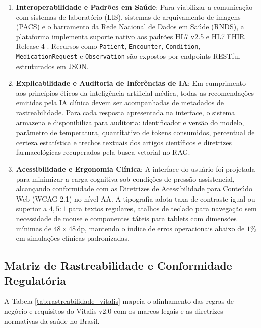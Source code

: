 \begin{enumerate}[label=\textbf{RNF-\arabic*:}, leftmargin=*]
    \item \textbf{Interoperabilidade e Padrões em Saúde}:
    Para viabilizar a comunicação com sistemas de laboratório (LIS), sistemas de arquivamento de imagens (PACS) e o barramento da Rede Nacional de Dados em Saúde (RNDS), a plataforma implementa suporte nativo aos padrões HL7 v2.5 e HL7 FHIR Release 4 \cite{hl7_fhir:2019}. Recursos como \texttt{Patient}, \texttt{Encounter}, \texttt{Condition}, \texttt{MedicationRequest} e \texttt{Observation} são expostos por endpoints RESTful estruturados em JSON.

    \item \textbf{Explicabilidade e Auditoria de Inferências de IA}:
    Em cumprimento aos princípios éticos da inteligência artificial médica, todas as recomendações emitidas pela IA clínica devem ser acompanhadas de metadados de rastreabilidade. Para cada resposta apresentada na interface, o sistema armazena e disponibiliza para auditoria: identificador e versão do modelo, parâmetro de temperatura, quantitativo de tokens consumidos, percentual de certeza estatística e trechos textuais dos artigos científicos e diretrizes farmacológicas recuperados pela busca vetorial no RAG.

    \item \textbf{Acessibilidade e Ergonomia Clínica}:
    A interface do usuário foi projetada para minimizar a carga cognitiva sob condições de pressão assistencial, alcançando conformidade com as Diretrizes de Acessibilidade para Conteúdo Web (WCAG 2.1) no nível AA. A tipografia adota taxa de contraste igual ou superior a $4{,}5:1$ para textos regulares, atalhos de teclado para navegação sem necessidade de mouse e componentes táteis para tablets com dimensões mínimas de $48 \times 48\,\text{dp}$, mantendo o índice de erros operacionais abaixo de $1\%$ em simulações clínicas padronizadas.
\end{enumerate}

\subsection{Matriz de Rastreabilidade e Conformidade Regulatória}

A Tabela \ref{tab:rastreabilidade_vitalis} mapeia o alinhamento das regras de negócio e requisitos do Vitalis v2.0 com os marcos legais e as diretrizes normativas da saúde no Brasil.

